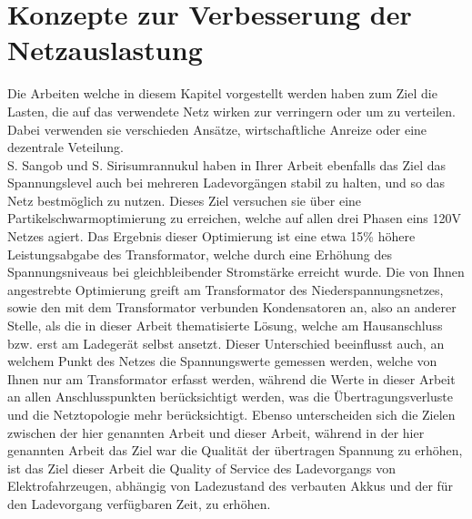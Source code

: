 \section{Konzepte zur Verbesserung der Netzauslastung}
Die Arbeiten welche in diesem Kapitel vorgestellt werden haben zum Ziel die Lasten, die auf das verwendete Netz wirken zur verringern oder um zu verteilen. Dabei verwenden sie verschieden Ansätze, wirtschaftliche Anreize oder eine dezentrale Veteilung.\\
S. Sangob und S. Sirisumrannukul \cite{RW_1_1} haben in Ihrer Arbeit ebenfalls das Ziel das Spannungslevel auch bei mehreren Ladevorgängen stabil zu halten, und so das Netz bestmöglich zu nutzen. Dieses Ziel versuchen sie über eine Partikelschwarmoptimierung zu erreichen, welche auf allen drei Phasen eins 120V Netzes agiert. Das Ergebnis dieser Optimierung ist eine etwa 15\% höhere Leistungsabgabe des Transformator, welche durch eine Erhöhung des Spannungsniveaus bei gleichbleibender Stromstärke erreicht wurde. Die von Ihnen angestrebte Optimierung greift  am Transformator des Niederspannungsnetzes, sowie den mit dem Transformator verbunden Kondensatoren an, also an anderer Stelle, als die in dieser Arbeit thematisierte Lösung, welche am Hausanschluss bzw. erst am Ladegerät selbst ansetzt. Dieser Unterschied beeinflusst auch, an welchem Punkt des Netzes die Spannungswerte gemessen werden, welche von Ihnen nur am Transformator erfasst werden, während die Werte in dieser Arbeit an allen Anschlusspunkten berücksichtigt werden, was die Übertragungsverluste und die Netztopologie mehr berücksichtigt. Ebenso unterscheiden sich die Zielen zwischen der hier genannten Arbeit und dieser Arbeit, während in der hier genannten Arbeit das Ziel war die Qualität der übertragen Spannung zu erhöhen, ist das Ziel dieser Arbeit die Quality of Service des Ladevorgangs von Elektrofahrzeugen, abhängig von Ladezustand des verbauten Akkus und der für den Ladevorgang verfügbaren Zeit, zu erhöhen.
\\
